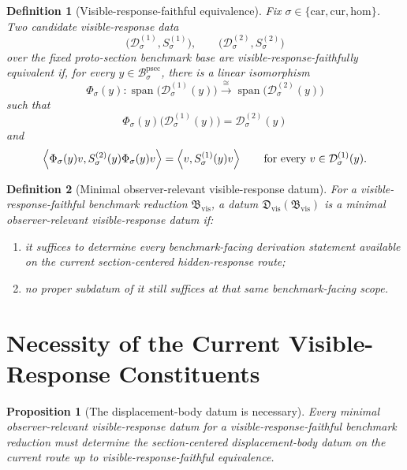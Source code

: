 \documentclass[11pt]{article}
\newcommand{\Car}{\mathrm{car}}
\newcommand{\Cur}{\mathrm{cur}}
\newcommand{\Hom}{\mathrm{hom}}
\newcommand{\ProtoSectionBody}[1]{\mathcal B_{#1}^{\mathrm{psec}}}
\newcommand{\VisibleReduction}{\mathfrak B_{\mathrm{vis}}}
\newcommand{\VisibleDatum}{\mathfrak D_{\mathrm{vis}}}
\newtheorem{definition}{Definition}
\newtheorem{proposition}{Proposition}
\begin{document}
\begin{definition}[Visible-response-faithful equivalence]
\label{def:equiv}
Fix \(\sigma\in\{\Car,\Cur,\Hom\}\).
Two candidate visible-response data
\[
\bigl(\mathcal D_{\sigma}^{(1)},S_{\sigma}^{(1)}\bigr),
\qquad
\bigl(\mathcal D_{\sigma}^{(2)},S_{\sigma}^{(2)}\bigr)
\]
over the fixed proto-section benchmark base are \emph{visible-response-faithfully equivalent} if, for every \(y\in\ProtoSectionBody{\sigma}\), there is a linear isomorphism
\[
\Phi_{\sigma}(y):
\operatorname{span}\bigl(\mathcal D_{\sigma}^{(1)}(y)\bigr)
\xrightarrow{\cong}
\operatorname{span}\bigl(\mathcal D_{\sigma}^{(2)}(y)\bigr)
\]
such that
\[
\Phi_{\sigma}(y)\bigl(\mathcal D_{\sigma}^{(1)}(y)\bigr)
=
\mathcal D_{\sigma}^{(2)}(y)
\]
and
\[
\ev{\Phi_{\sigma}(y)v,S_{\sigma}^{(2)}(y)\Phi_{\sigma}(y)v}
=
\ev{v,S_{\sigma}^{(1)}(y)v}
\qquad
\text{for every }
v\in\mathcal D_{\sigma}^{(1)}(y).
\]
\end{definition}

\begin{definition}[Minimal observer-relevant visible-response datum]
\label{def:minimal}
For a visible-response-faithful benchmark reduction \(\VisibleReduction\), a datum \(\VisibleDatum(\VisibleReduction)\) is a \emph{minimal observer-relevant visible-response datum} if:
\begin{enumerate}
    \item it suffices to determine every benchmark-facing derivation statement available on the current section-centered hidden-response route;
    \item no proper subdatum of it still suffices at that same benchmark-facing scope.
\end{enumerate}
\end{definition}

\section{Necessity of the Current Visible-Response Constituents}

\begin{proposition}[The displacement-body datum is necessary]
\label{prop:body}
Every minimal observer-relevant visible-response datum for a visible-response-faithful benchmark reduction must determine the section-centered displacement-body datum on the current route up to visible-response-faithful equivalence.
\end{proposition}
\end{document}
